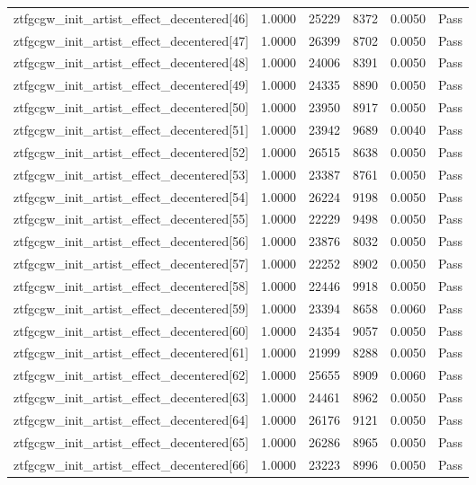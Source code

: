 \begin{table}[htbp]
\begin{tabular}{llrrll}
ztfgcgw\_init\_artist\_effect\_decentered[46] & 1.0000 & 25229 & 8372 & 0.0050 & Pass \\
ztfgcgw\_init\_artist\_effect\_decentered[47] & 1.0000 & 26399 & 8702 & 0.0050 & Pass \\
ztfgcgw\_init\_artist\_effect\_decentered[48] & 1.0000 & 24006 & 8391 & 0.0050 & Pass \\
ztfgcgw\_init\_artist\_effect\_decentered[49] & 1.0000 & 24335 & 8890 & 0.0050 & Pass \\
ztfgcgw\_init\_artist\_effect\_decentered[50] & 1.0000 & 23950 & 8917 & 0.0050 & Pass \\
ztfgcgw\_init\_artist\_effect\_decentered[51] & 1.0000 & 23942 & 9689 & 0.0040 & Pass \\
ztfgcgw\_init\_artist\_effect\_decentered[52] & 1.0000 & 26515 & 8638 & 0.0050 & Pass \\
ztfgcgw\_init\_artist\_effect\_decentered[53] & 1.0000 & 23387 & 8761 & 0.0050 & Pass \\
ztfgcgw\_init\_artist\_effect\_decentered[54] & 1.0000 & 26224 & 9198 & 0.0050 & Pass \\
ztfgcgw\_init\_artist\_effect\_decentered[55] & 1.0000 & 22229 & 9498 & 0.0050 & Pass \\
ztfgcgw\_init\_artist\_effect\_decentered[56] & 1.0000 & 23876 & 8032 & 0.0050 & Pass \\
ztfgcgw\_init\_artist\_effect\_decentered[57] & 1.0000 & 22252 & 8902 & 0.0050 & Pass \\
ztfgcgw\_init\_artist\_effect\_decentered[58] & 1.0000 & 22446 & 9918 & 0.0050 & Pass \\
ztfgcgw\_init\_artist\_effect\_decentered[59] & 1.0000 & 23394 & 8658 & 0.0060 & Pass \\
ztfgcgw\_init\_artist\_effect\_decentered[60] & 1.0000 & 24354 & 9057 & 0.0050 & Pass \\
ztfgcgw\_init\_artist\_effect\_decentered[61] & 1.0000 & 21999 & 8288 & 0.0050 & Pass \\
ztfgcgw\_init\_artist\_effect\_decentered[62] & 1.0000 & 25655 & 8909 & 0.0060 & Pass \\
ztfgcgw\_init\_artist\_effect\_decentered[63] & 1.0000 & 24461 & 8962 & 0.0050 & Pass \\
ztfgcgw\_init\_artist\_effect\_decentered[64] & 1.0000 & 26176 & 9121 & 0.0050 & Pass \\
ztfgcgw\_init\_artist\_effect\_decentered[65] & 1.0000 & 26286 & 8965 & 0.0050 & Pass \\
ztfgcgw\_init\_artist\_effect\_decentered[66] & 1.0000 & 23223 & 8996 & 0.0050 & Pass \\

\end{tabular}
\end{table}
